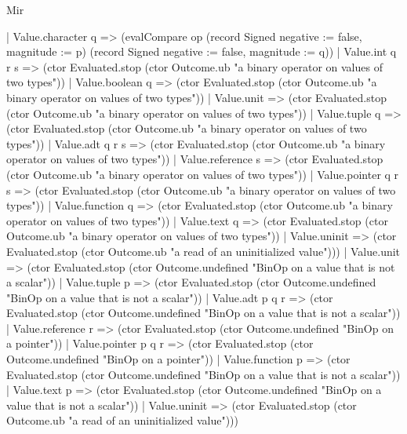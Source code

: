 \begin{lexlean}{Mir}
\begin{semanticmodule}
{      | Value.character q => (evalCompare op (record Signed {negative := false, magnitude := p}) (record Signed {negative := false, magnitude := q}))
      | Value.int q r s => (ctor Evaluated.stop (ctor Outcome.ub "a binary operator on values of two types"))
      | Value.boolean q => (ctor Evaluated.stop (ctor Outcome.ub "a binary operator on values of two types"))
      | Value.unit => (ctor Evaluated.stop (ctor Outcome.ub "a binary operator on values of two types"))
      | Value.tuple q => (ctor Evaluated.stop (ctor Outcome.ub "a binary operator on values of two types"))
      | Value.adt q r s => (ctor Evaluated.stop (ctor Outcome.ub "a binary operator on values of two types"))
      | Value.reference s => (ctor Evaluated.stop (ctor Outcome.ub "a binary operator on values of two types"))
      | Value.pointer q r s => (ctor Evaluated.stop (ctor Outcome.ub "a binary operator on values of two types"))
      | Value.function q => (ctor Evaluated.stop (ctor Outcome.ub "a binary operator on values of two types"))
      | Value.text q => (ctor Evaluated.stop (ctor Outcome.ub "a binary operator on values of two types"))
      | Value.uninit => (ctor Evaluated.stop (ctor Outcome.ub "a read of an uninitialized value")))
    | Value.unit => (ctor Evaluated.stop (ctor Outcome.undefined "BinOp on a value that is not a scalar"))
    | Value.tuple p => (ctor Evaluated.stop (ctor Outcome.undefined "BinOp on a value that is not a scalar"))
    | Value.adt p q r => (ctor Evaluated.stop (ctor Outcome.undefined "BinOp on a value that is not a scalar"))
    | Value.reference r => (ctor Evaluated.stop (ctor Outcome.undefined "BinOp on a pointer"))
    | Value.pointer p q r => (ctor Evaluated.stop (ctor Outcome.undefined "BinOp on a pointer"))
    | Value.function p => (ctor Evaluated.stop (ctor Outcome.undefined "BinOp on a value that is not a scalar"))
    | Value.text p => (ctor Evaluated.stop (ctor Outcome.undefined "BinOp on a value that is not a scalar"))
    | Value.uninit => (ctor Evaluated.stop (ctor Outcome.ub "a read of an uninitialized value")))
}


\end{semanticmodule}
\end{lexlean}
